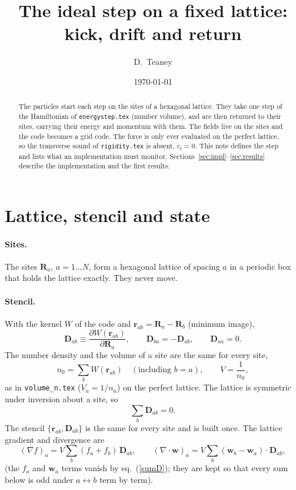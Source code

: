 \documentclass[11pt,aps,preprint,nofootinbib,superscriptaddress,tightenlines]{revtex4-2}
\def\st{\begin{equation}}
\def\stp{\end{equation}}
\def\Eq#1{eq.~(\ref{#1})}
\let\oldparagraph\paragraph
\renewcommand{\paragraph}{\par\bigskip\oldparagraph}
\begin{document}
\title{The ideal step on a fixed lattice: kick, drift and return}
\author{D.~Teaney}
\date{\today}

\begin{abstract}
The particles start each step on the sites of a hexagonal lattice.  They take one
step of the Hamiltonian of \texttt{energystep.tex} (number volume), and are then
returned to their sites, carrying their energy and momentum with them.  The fields
live on the sites and the code becomes a grid code.  The force is only ever
evaluated on the perfect lattice, so the transverse sound of \texttt{rigidity.tex}
is absent, $c_t=0$.  This note defines the step and lists what an implementation
must monitor.  Sections~\ref{sec:impl}--\ref{sec:results} describe the implementation and the
first results.
\end{abstract}

\maketitle

\section{Lattice, stencil and state}
\label{sec:lattice}

\paragraph{Sites.}  The sites $\bm R_a$, $a=1\ldots N$, form a hexagonal lattice of
spacing $a$ in a periodic box that holds the lattice exactly.  They never move.

\paragraph{Stencil.}  With the kernel $W$ of the code and $\bm r_{ab}=\bm R_a-\bm R_b$
(minimum image),
\st
\bm D_{ab}\equiv\frac{\partial W(\bm r_{ab})}{\partial\bm R_a},\qquad
\bm D_{ba}=-\bm D_{ab},\qquad \bm D_{aa}=0 .
\stp
The number density and the volume of a site are the same for every site,
\st
n_0=\sum_bW(\bm r_{ab})\quad(\text{including }b=a),\qquad V=\frac1{n_0},
\stp
as in \texttt{volume\_n.tex} ($V_a=1/n_a$) on the perfect lattice.  The lattice is
symmetric under inversion about a site, so
\st
\sum_b\bm D_{ab}=0 .
\label{sumD}
\stp
The stencil $\{\bm r_{ab},\bm D_{ab}\}$ is the same for every site and is built once.
The lattice gradient and divergence are
\st
(\nabla f)_a=V\sum_b(f_a+f_b)\,\bm D_{ab},\qquad
(\nabla\cdot\bm w)_a=V\sum_b(\bm w_b-\bm w_a)\cdot\bm D_{ab} ,
\label{ops}
\stp
(the $f_a$ and $\bm w_a$ terms vanish by \Eq{sumD}; they are kept so that every sum
below is odd under $a\leftrightarrow b$ term by term).
\end{document}
